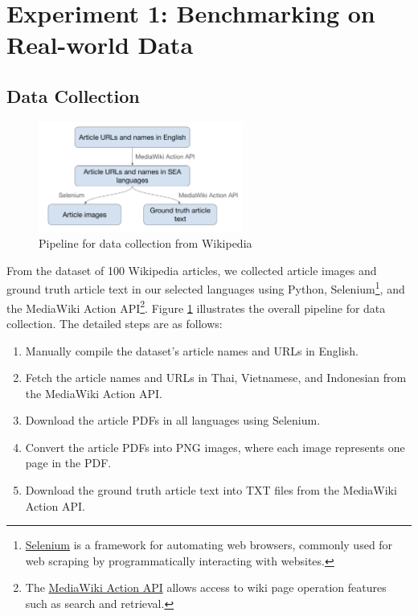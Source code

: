 \documentclass[12pt,oneside]{memoir}
\begin{document}
\section{Experiment 1: Benchmarking on Real-world Data}

\subsection{Data Collection}

\begin{figure}[ht]
    \centering
    \includegraphics[width=0.6\textwidth]{images/data-collection.png}
    \caption{Pipeline for data collection from Wikipedia}
    \label{figure:data-collection}
\end{figure}

From the dataset of 100 Wikipedia articles, we collected article images and ground 
truth article text in our selected languages using Python, 
Selenium\footnote{\href{https://selenium-python.readthedocs.io}{Selenium} is a 
framework for automating web browsers, commonly used for web scraping by programmatically 
interacting with websites.}, and the MediaWiki Action API\footnote{The \href{https://www.mediawiki.org/wiki/API:Main_page}{MediaWiki Action API} allows 
access to wiki page operation features such as search and retrieval.}. Figure \ref{figure:data-collection} illustrates the overall pipeline 
for data collection. The detailed steps are as follows:

\begin{enumerate}
    \item Manually compile the dataset’s article names and URLs in English.
    \item Fetch the article names and URLs in Thai, Vietnamese, and Indonesian from the MediaWiki Action API.
    \item Download the article PDFs in all languages using Selenium.
    \item Convert the article PDFs into PNG images, where each image represents one page in the PDF.
    \item Download the ground truth article text into TXT files from the MediaWiki Action API.
\end{enumerate}
\end{document}
